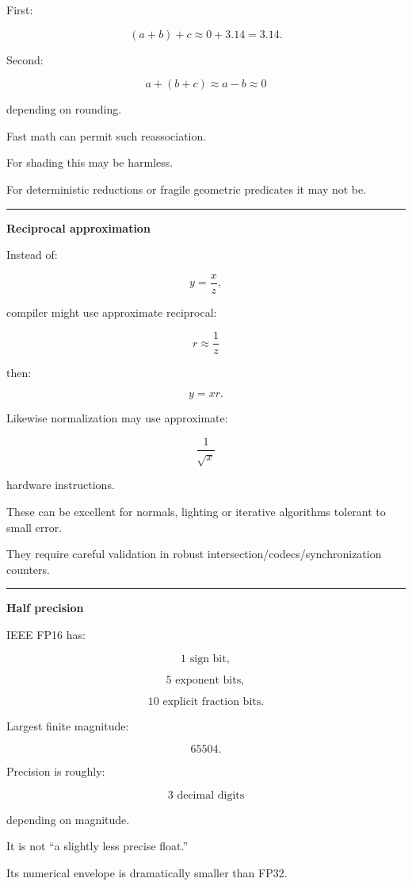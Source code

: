 First:

\[
(a+b)+c
\approx
0+3.14
=
3.14.
\]

Second:

\[
a+(b+c)
\approx
a-b
\approx0
\]

depending on rounding.

Fast math can permit such reassociation.

For shading this may be harmless.

For deterministic reductions or fragile geometric predicates it may not be.

\begin{center}\rule{0.5\linewidth}{0.5pt}\end{center}

\textbf{Reciprocal approximation}

Instead of:

\[
y=\frac{x}{z},
\]

compiler might use approximate reciprocal:

\[
r\approx\frac1z
\]

then:

\[
y=xr.
\]

Likewise normalization may use approximate:

\[
\frac1{\sqrt{x}}
\]

hardware instructions.

These can be excellent for normals, lighting or iterative algorithms tolerant to small error.

They require careful validation in robust intersection/codecs/synchronization counters.

\begin{center}\rule{0.5\linewidth}{0.5pt}\end{center}

\textbf{Half precision}

IEEE FP16 has:

\[
1\text{ sign bit},
\]

\[
5\text{ exponent bits},
\]

\[
10\text{ explicit fraction bits}.
\]

Largest finite magnitude:

\[
65504.
\]

Precision is roughly:

\[
3\text{ decimal digits}
\]

depending on magnitude.

It is not ``a slightly less precise float.''

Its numerical envelope is dramatically smaller than FP32.


